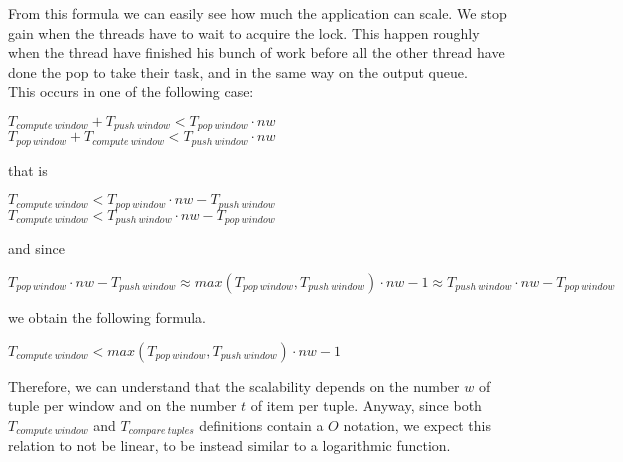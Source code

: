 \noindent
From  this formula we can easily see how much the application can scale. We stop gain when the threads have to wait to acquire the lock. This happen roughly when the thread have finished his bunch of work before all the other thread have done the pop to take their task, and in the same way on the output queue.\\
This occurs in one of the following case:
\begin{center}
    $T_{compute\ window} + T_{push\ window} < T_{pop\ window} \cdot nw$ \\
    $T_{pop\ window} + T_{compute\ window} < T_{push\ window} \cdot nw$
\end{center}
that is
\begin{center}
    $T_{compute\ window} < T_{pop\ window} \cdot nw - T_{push\ window}$ \\
    $T_{compute\ window} < T_{push\ window} \cdot nw - T_{pop\ window}$
\end{center}
and since
\begin{center}
    $T_{pop\ window} \cdot nw - T_{push\ window} \approx max(T_{pop\ window}, T_{push\ window}) \cdot nw - 1 \approx T_{push\ window} \cdot nw - T_{pop\ window}$
\end{center}
we obtain the following formula.
\begin{center}
    $T_{compute\ window} < max(T_{pop\ window}, T_{push\ window}) \cdot nw - 1$
\end{center}

\bigskip\noindent
Therefore, we can understand that the scalability depends on the number $w$ of tuple per window and on the number $t$ of item per tuple. Anyway, since both $T_{compute\ window}$ and $T_{compare\ tuples}$ definitions contain a $O$ notation, we expect this relation to not be linear, to be instead similar to a logarithmic function.